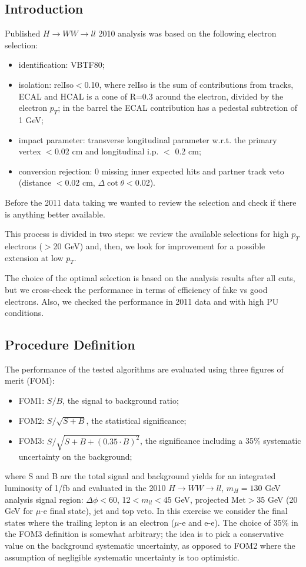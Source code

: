 \subsection{Introduction}
Published $H\rightarrow WW\rightarrow ll$ 2010 analysis was based on the following electron selection:
\begin{itemize}
\item identification: VBTF80;
\item isolation: relIso$<$0.10, where relIso is the sum of contributions from tracks, ECAL and HCAL is a cone of R=0.3 around the electron, 
divided by the electron $p_T$; in the barrel the ECAL contribution has a pedestal subtrction of 1 GeV;
\item impact parameter: transverse longitudinal parameter w.r.t. the primary vertex $<0.02$ cm and longitudinal i.p. $<$ 0.2 cm;
\item conversion rejection: 0 missing inner expected hits and partner track veto (distance $<$0.02 cm, $\Delta \cot \theta <$0.02).
\end{itemize}
Before the 2011 data taking we wanted to review the selection and check if there is anything better available.

This process is divided in two steps: we review the available selections for high $p_T$ electrons ($>$20 GeV) and, then, 
we look for improvement for a possible extension at low $p_T$.

The choice of the optimal selection is based on the analysis results after all cuts, 
but we cross-check the performance in terms of efficiency of fake vs good electrons.
Also, we checked the performance in 2011 data and with high PU conditions.

\subsection{Procedure Definition}
The performance of the tested algorithms are evaluated using three figures of merit (FOM):
\begin{itemize}
\item FOM1: $S/B$, the signal to background ratio;
\item FOM2: $S/\sqrt{S+B}$, the statistical significance;
\item FOM3: $S/\sqrt{S+B+(0.35 \cdot B)^2}$, the significance including a 35\% systematic uncertainty on the background;
\end{itemize}
where S and B are the total signal and background yields for an integrated luminosity of 1/fb and evaluated in the 2010 
$H\rightarrow WW\rightarrow ll$, $m_H=130$ GeV analysis signal region:
$\Delta\phi < 60$, 12$< m_{ll} <$45 GeV, projected Met$>$35 GeV (20 GeV for $\mu$-e final state), jet and top veto.
In this exercise we consider the final states where the trailing lepton is an electron ($\mu$-e and e-e).
The choice of 35\% in the FOM3 definition is somewhat arbitrary; the idea is to pick a conservative value on the background systematic uncertainty, 
as opposed to FOM2 where the assumption of negligible systematic uncertainty is too optimistic.

